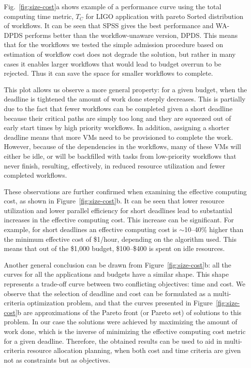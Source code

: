 \documentclass[conference]{IEEEtran}
\begin{document}
Fig.~\ref{fig:size-cost}a shows example of a performance curve using the total computing
time metric, $T_C$ for LIGO application with pareto Sorted distribution of
workflows. It can be seen that SPSS gives the best performance and WA-DPDS
performs better than the workflow-unaware version, DPDS. 
This means that for the workflows we tested the simple admission procedure based 
on estimation of workflow cost does not degrade the solution, but rather in 
many cases it enables larger workflows that would lead to budget overrun to
be rejected. Thus it can save the space for smaller workflows to complete.


This plot allows us observe a more general property: for a given budget,
when the deadline is tightened the amount of work done steeply decreases. 
This is partially due to the fact that fewer workflows can be
completed given a short deadline because their critical paths are simply too long
and they are squeezed out of early start times by high priority workflows.
In addition, assigning a shorter deadline means that more VMs need to be
provisioned to complete the work. However, because of the dependencies in the 
workflows, many of these VMs will either be idle, or will be backfilled with 
tasks from low-priority workflows that never finish, resulting, effectively, 
in reduced resource utilization and fewer completed workflows.

These observations are further confirmed when examining the effective computing
cost, as shown in Figure~\ref{fig:size-cost}b. It can be seen that lower
resource utilization and lower parallel efficiency for short deadlines lead to
substantial increases in the effective computing cost. This increase can be 
significant. For example, for short deadlines an effective computing cost
is $\sim$10--40\% higher than the minimum effective cost of \$1/hour, depending
on the algorithm used. This means that out of the \$1,000 budget, \$100--\$400
is spent on idle resources.

Another general conclusion can be drawn from Figure~\ref{fig:size-cost}b:
all the curves for all the applications and budgets have a similar shape. This
shape represents a trade-off curve between two conflicting objectives: time and cost.
We observe that the selection of deadline and cost can be formulated as a
multi-criteria optimization problem, and that the curves presented in 
Figure~\ref{fig:size-cost}b are approximations of the Pareto front (or Pareto
set) of solutions to this problem. In our case the solutions were achieved by maximizing
the amount of work done, which is the inverse of minimizing the effective 
computing cost metric for a given deadline. Therefore, the obtained results 
can be used to aid in multi-criteria resource allocation planning, when both
cost and time criteria are given not as constraints but as objectives.
\end{document}
